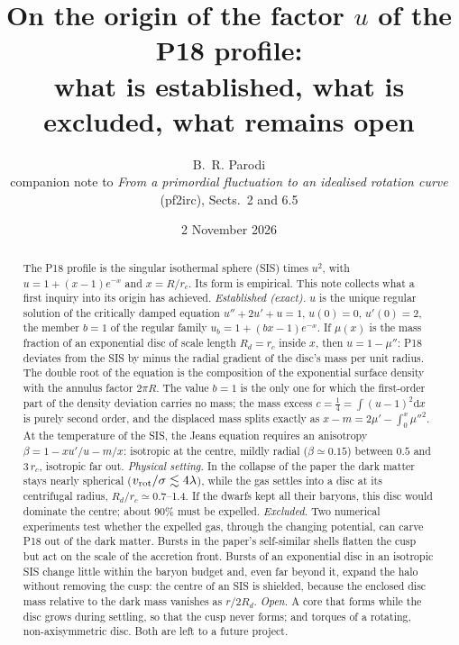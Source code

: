 \documentclass[11pt,a4paper]{article}
\title{On the origin of the factor $u$ of the P18 profile:\\
what is established, what is excluded, what remains open}
\author{B.~R. Parodi\\[2pt]\small companion note to \emph{From a primordial fluctuation to an idealised
rotation curve} (pf2irc), Sects.~2 and 6.5}
\date{2 November 2026}
\theoremstyle{definition}
\theoremstyle{remark}
\newcommand{\rc}{r_c}
\newcommand{\Rd}{R_d}
\newcommand{\dd}{\mathrm{d}}
\begin{document}
\maketitle

\begin{abstract}
\noindent The P18 profile is the singular isothermal sphere (SIS) times $u^2$, with
$u=1+(x-1)e^{-x}$ and $x=R/\rc$. Its form is empirical. This note collects what a first
inquiry into its origin has achieved. \emph{Established (exact).} $u$ is the unique
regular solution of the critically damped equation $u''+2u'+u=1$, $u(0)=0$, $u'(0)=2$, the
member $b=1$ of the regular family $u_b=1+(bx-1)e^{-x}$. If $\mu(x)$ is the mass fraction of
an exponential disc of scale length $\Rd=\rc$ inside $x$, then $u=1-\mu''$: P18 deviates
from the SIS by minus the radial gradient of the disc's mass per unit radius. The double
root of the equation is the composition of the exponential surface density with the
annulus factor $2\pi R$. The value $b=1$ is the only one for which the first-order part of
the density deviation carries no mass; the mass excess $c=\tfrac14=\int(u-1)^2\dd x$ is
purely second order, and the displaced mass splits exactly as
$x-m=2\mu'-\int_0^x\mu''^2$. At the temperature of the SIS, the Jeans equation requires
an anisotropy $\beta=1-xu'/u-m/x$: isotropic at the centre, mildly radial ($\beta\simeq0.15$)
between $0.5$ and $3\,\rc$, isotropic far out. \emph{Physical setting.} In the collapse of
the paper the dark matter stays nearly spherical ($v_{\rm rot}/\sigma\lesssim4\lambda$), while the gas
settles into a disc at its centrifugal radius, $\Rd/\rc\simeq0.7$--1.4. If the dwarfs kept
all their baryons, this disc would dominate the centre; about 90\% must be expelled.
\emph{Excluded.} Two numerical experiments test whether the expelled gas, through the
changing potential, can carve P18 out of the dark matter. Bursts in the paper's
self-similar shells flatten the cusp but act on the scale of the accretion front. Bursts of
an exponential disc in an isotropic SIS change little within the baryon budget and, even far
beyond it, expand the halo without removing the cusp: the centre of an SIS is shielded,
because the enclosed disc mass relative to the dark mass vanishes as $r/2\Rd$. \emph{Open.}
A core that forms while the disc grows during settling, so that the cusp never forms; and
torques of a rotating, non-axisymmetric disc. Both are left to a future project.
\end{abstract}

\tableofcontents
\bigskip
\end{document}
